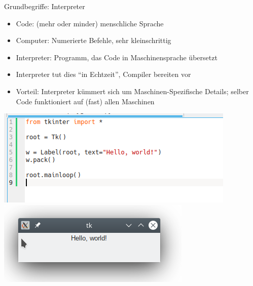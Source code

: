 \begin{frame}{Grundbegriffe: Interpreter}
%
\begin{minipage}{.49\linewidth}
\begin{itemize}
\item Code: (mehr oder minder) menschliche Sprache
\item Computer: Numerierte Befehle, sehr kleinschrittig
\item Interpreter: Programm, das Code in Maschinensprache übersetzt
\item Interpreter tut dies \enquote{in Echtzeit}, Compiler bereiten vor
\item Vorteil: Interpreter kümmert sich um Maschinen-Spezifische Details; selber Code funktioniert auf (fast) allen Maschinen
\end{itemize}
\end{minipage}
%
%
\begin{minipage}[t]{.49\linewidth}
\includegraphics[width=\linewidth]{./gfx/TK-HelloWorld-Code}
\includegraphics[width=\linewidth]{./gfx/TK-HelloWorld-Run}
\end{minipage}
%
\end{frame}


